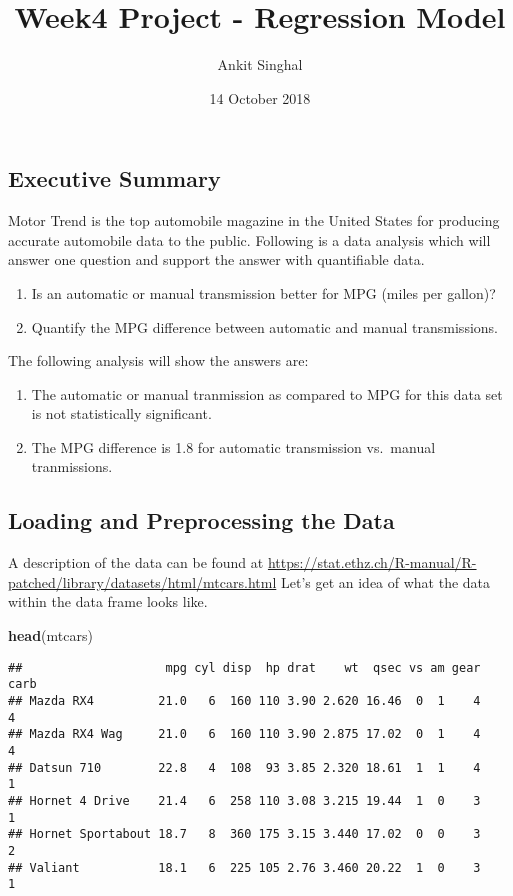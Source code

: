 \documentclass[]{article}
\title{Week4 Project - Regression Model}
\author{Ankit Singhal}
\date{14 October 2018}
\newenvironment{Shaded}{\begin{snugshade}}{\end{snugshade}}
\newcommand{\KeywordTok}[1]{\textcolor[rgb]{0.13,0.29,0.53}{\textbf{#1}}}
\newcommand{\NormalTok}[1]{#1}
\providecommand{\tightlist}{%
  \setlength{\itemsep}{0pt}\setlength{\parskip}{0pt}}
\begin{document}
\maketitle

\subsection{Executive Summary}\label{executive-summary}

Motor Trend is the top automobile magazine in the United States for
producing accurate automobile data to the public. Following is a data
analysis which will answer one question and support the answer with
quantifiable data.

\begin{enumerate}
\def\labelenumi{\arabic{enumi}.}
\tightlist
\item
  Is an automatic or manual transmission better for MPG (miles per
  gallon)?
\item
  Quantify the MPG difference between automatic and manual
  transmissions.
\end{enumerate}

The following analysis will show the answers are:

\begin{enumerate}
\def\labelenumi{\arabic{enumi}.}
\tightlist
\item
  The automatic or manual tranmission as compared to MPG for this data
  set is not statistically significant.
\item
  The MPG difference is 1.8 for automatic transmission vs.~manual
  tranmissions.
\end{enumerate}

\subsection{Loading and Preprocessing the
Data}\label{loading-and-preprocessing-the-data}

A description of the data can be found at
\url{https://stat.ethz.ch/R-manual/R-patched/library/datasets/html/mtcars.html}
Let's get an idea of what the data within the data frame looks like.

\begin{Shaded}
\begin{Highlighting}[]
\KeywordTok{head}\NormalTok{(mtcars)}
\end{Highlighting}
\end{Shaded}

\begin{verbatim}
##                    mpg cyl disp  hp drat    wt  qsec vs am gear carb
## Mazda RX4         21.0   6  160 110 3.90 2.620 16.46  0  1    4    4
## Mazda RX4 Wag     21.0   6  160 110 3.90 2.875 17.02  0  1    4    4
## Datsun 710        22.8   4  108  93 3.85 2.320 18.61  1  1    4    1
## Hornet 4 Drive    21.4   6  258 110 3.08 3.215 19.44  1  0    3    1
## Hornet Sportabout 18.7   8  360 175 3.15 3.440 17.02  0  0    3    2
## Valiant           18.1   6  225 105 2.76 3.460 20.22  1  0    3    1
\end{verbatim}
\end{document}
